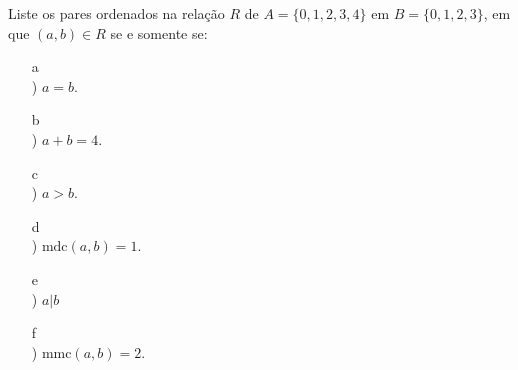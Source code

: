 \documentclass{article}
\begin{document}
Liste os pares ordenados na relação $R$ de $A = \{0, 1, 2, 3, 4\}$ em $B = \{0, 1, 2, 3\}$, em que $(a, b) \in R$ se e somente se:

\begin{enumerate}
    \item[a\\)] $a = b$.
    \item[b\\)] $a + b = 4$.
    \item[c\\)] $a > b$.
    \item[d\\)] $\text{mdc}(a, b) = 1$.
    \item[e\\)] $a | b$
    \item[f\\)] $\text{mmc}(a, b) = 2$.
\end{enumerate}
\end{document}
